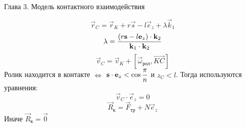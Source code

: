 \begin{frame}{Глава 3. Модель контактного взаимодействия}
        \begin{figure}[htb]
            \centering
            \label{ContactScheme}
        \end{figure}
    \endminipage
    \quad
        $$ \vec{r}_C = \vec{r}_K + r\vec{s} - l\vec{e}_z + \lambda\vec{k}_1 $$
        $$ \lambda = \displaystyle\frac{\displaystyle \left(r\boldsymbol{\mathbf{s}} - l\boldsymbol{\mathbf{e}}_z\right)\cdot\boldsymbol{\mathbf{k}}_2}{\displaystyle  \boldsymbol{\mathbf{k}}_1\cdot\boldsymbol{\mathbf{k}}_2} $$
        $$ \vec{v}_C = \vec{v}_K + [ \vec{\omega}_{\text{рол}}, \overrightarrow{KC} ] $$
        Ролик находится в контакте $\iff$ $\boldsymbol{\mathbf{s}} \cdot \boldsymbol{\mathbf{e}}_z < \cos\displaystyle\frac{\displaystyle \pi}{\displaystyle n} $ и $ z_C < l $. Тогда используются уравнения:
        $$ \vec{v}_C \cdot \vec{e}_z = 0 $$
        $$ \vec{R}_{\text{к}} = \vec{F}_{\text{тр}} + N\vec{e}_z $$
        Иначе $ \vec{R}_{\text{к}} = \vec{0} $
    \endminipage
\end{frame}